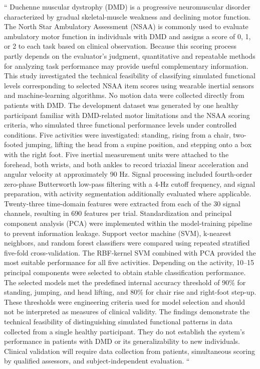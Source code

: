 \begin{EnglishAbstract}
	
	``
	Duchenne muscular dystrophy (DMD) is a progressive neuromuscular disorder characterized by gradual skeletal-muscle weakness and declining motor function. The North Star Ambulatory Assessment (NSAA) is commonly used to evaluate ambulatory motor function in individuals with DMD and assigns a score of 0, 1, or 2 to each task based on clinical observation. Because this scoring process partly depends on the evaluator’s judgment, quantitative and repeatable methods for analyzing task performance may provide useful complementary information. This study investigated the technical feasibility of classifying simulated functional levels corresponding to selected NSAA item scores using wearable inertial sensors and machine-learning algorithms.
	No motion data were collected directly from patients with DMD. The development dataset was generated by one healthy participant familiar with DMD-related motor limitations and the NSAA scoring criteria, who simulated three functional performance levels under controlled conditions. Five activities were investigated: standing, rising from a chair, two-footed jumping, lifting the head from a supine position, and stepping onto a box with the right foot. Five inertial measurement units were attached to the forehead, both wrists, and both ankles to record triaxial linear acceleration and angular velocity at approximately 90 Hz. Signal processing included fourth-order zero-phase Butterworth low-pass filtering with a 4-Hz cutoff frequency, and signal preparation, with activity segmentation additionally evaluated where applicable. Twenty-three time-domain features were extracted from each of the 30 signal channels, resulting in 690 features per trial. Standardization and principal component analysis (PCA) were implemented within the model-training pipeline to prevent information leakage. Support vector machine (SVM), k-nearest neighbors, and random forest classifiers were compared using repeated stratified five-fold cross-validation.
	The RBF-kernel SVM combined with PCA provided the most suitable performance for all five activities. Depending on the activity, 10–15 principal components were selected to obtain stable classification performance. The selected models met the predefined internal accuracy threshold of 90\% for standing, jumping, and head lifting, and 80\% for chair rise and right-foot step-up. These thresholds were engineering criteria used for model selection and should not be interpreted as measures of clinical validity.
	The findings demonstrate the technical feasibility of distinguishing simulated functional patterns in data collected from a single healthy participant. They do not establish the system’s performance in patients with DMD or its generalizability to new individuals. Clinical validation will require data collection from patients, simultaneous scoring by qualified assessors, and subject-independent evaluation.
	``
	
	
\end{EnglishAbstract}